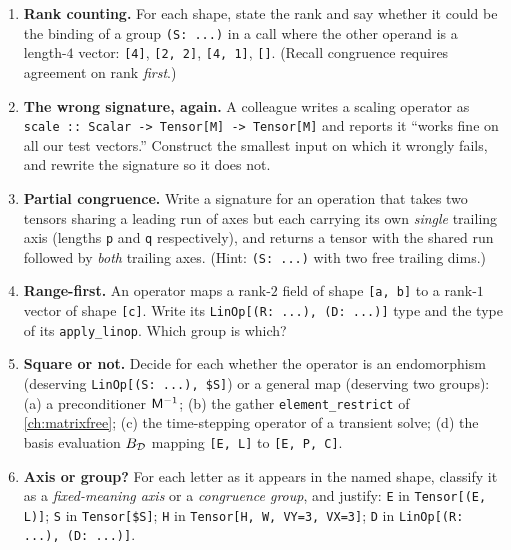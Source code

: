 \exercisessection
\begin{enumerate}[nosep]
  \item \textbf{Rank counting.} For each shape, state the rank and say whether
  it could be the binding of a group \lstinline[style=l4style]|(S: ...)| in a
  call where the other operand is a length-$4$ vector:
  \lstinline[style=l4style]|[4]|, \lstinline[style=l4style]|[2, 2]|,
  \lstinline[style=l4style]|[4, 1]|, \lstinline[style=l4style]|[]|.
  (Recall congruence requires agreement on rank \emph{first}.)

  \item \textbf{The wrong signature, again.} A colleague writes a scaling
  operator as \lstinline[style=l4style]|scale :: Scalar -> Tensor[M] -> Tensor[M]|
  and reports it ``works fine on all our test vectors.'' Construct the smallest
  input on which it wrongly fails, and rewrite the signature so it does not.

  \item \textbf{Partial congruence.} Write a signature for an operation that
  takes two tensors sharing a leading run of axes but each carrying its own
  \emph{single} trailing axis (lengths \texttt{p} and \texttt{q} respectively),
  and returns a tensor with the shared run followed by \emph{both} trailing
  axes. (Hint: \lstinline[style=l4style]|(S: ...)| with two free trailing
  dims.)

  \item \textbf{Range-first.} An operator maps a rank-$2$ field of shape
  \lstinline[style=l4style]|[a, b]| to a rank-$1$ vector of shape
  \lstinline[style=l4style]|[c]|. Write its
  \lstinline[style=l4style]|LinOp[(R: ...), (D: ...)]| type and the type of its
  \lstinline[style=l4style]|apply_linop|. Which group is which?

  \item \textbf{Square or not.} Decide for each whether the operator is an
  endomorphism (deserving \lstinline[style=l4style]|LinOp[(S: ...), $S]|) or a
  general map (deserving two groups): (a) a preconditioner $\mathsf{M}^{-1}$;
  (b) the gather \lstinline[style=l4style]|element_restrict| of
  \cref{ch:matrixfree}; (c) the time-stepping operator of a transient solve;
  (d) the basis evaluation $B_{\mathcal{D}}$ mapping
  \lstinline[style=l4style]|[E, L]| to \lstinline[style=l4style]|[E, P, C]|.

  \item \textbf{Axis or group?} For each letter as it appears in the named
  shape, classify it as a \emph{fixed-meaning axis} or a \emph{congruence
  group}, and justify: \texttt{E} in \lstinline[style=l4style]|Tensor[(E, L)]|;
  \texttt{S} in \lstinline[style=l4style]|Tensor[$S]|; \texttt{H} in
  \lstinline[style=l4style]|Tensor[H, W, VY=3, VX=3]|; \texttt{D} in
  \lstinline[style=l4style]|LinOp[(R: ...), (D: ...)]|.


\end{enumerate}
